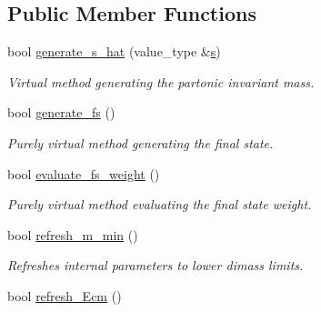 \subsection*{Public Member Functions}
\begin{DoxyCompactItemize}
\item 
\hypertarget{a00447_a7c1d0fb36da1afa7992571ce3b5f8c8c}{bool \hyperlink{a00447_a7c1d0fb36da1afa7992571ce3b5f8c8c}{generate\-\_\-s\-\_\-hat} (value\-\_\-type \&\hyperlink{a00442_a001116beb90eeda48f7cb668f67c8995}{s})}\label{a00447_a7c1d0fb36da1afa7992571ce3b5f8c8c}

\begin{DoxyCompactList}\small\item\em Virtual method generating the partonic invariant mass. \end{DoxyCompactList}\item 
\hypertarget{a00447_aa2740a5819e9b3e5c736990f0832676e}{bool \hyperlink{a00447_aa2740a5819e9b3e5c736990f0832676e}{generate\-\_\-fs} ()}\label{a00447_aa2740a5819e9b3e5c736990f0832676e}

\begin{DoxyCompactList}\small\item\em Purely virtual method generating the final state. \end{DoxyCompactList}\item 
\hypertarget{a00447_a9d2d780a4d56a2582515771a56696018}{bool \hyperlink{a00447_a9d2d780a4d56a2582515771a56696018}{evaluate\-\_\-fs\-\_\-weight} ()}\label{a00447_a9d2d780a4d56a2582515771a56696018}

\begin{DoxyCompactList}\small\item\em Purely virtual method evaluating the final state weight. \end{DoxyCompactList}\item 
\hypertarget{a00447_aa27daace2be96fb45db0a40c8e2a25db}{bool \hyperlink{a00447_aa27daace2be96fb45db0a40c8e2a25db}{refresh\-\_\-m\-\_\-min} ()}\label{a00447_aa27daace2be96fb45db0a40c8e2a25db}

\begin{DoxyCompactList}\small\item\em Refreshes internal parameters to lower dimass limits. \end{DoxyCompactList}\item 
\hypertarget{a00447_ab5f8042fe8ef6f02b4070d87d8f87e2a}{bool \hyperlink{a00447_ab5f8042fe8ef6f02b4070d87d8f87e2a}{refresh\-\_\-\-Ecm} ()}\label{a00447_ab5f8042fe8ef6f02b4070d87d8f87e2a}


\end{DoxyCompactItemize}
